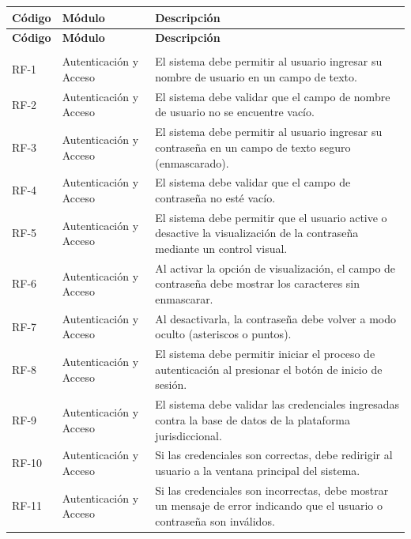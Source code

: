 \documentclass[12pt,a4paper,oneside]{book}
\begin{document}
\begingroup
\small
\setlength{\LTpre}{0pt}
\setlength{\LTpost}{0pt}
\begin{longtable}{@{}>{\centering\arraybackslash}p{2cm}
                    >{\centering\arraybackslash}p{3cm}
                    >{\raggedright\arraybackslash}p{10cm}@{}}
\toprule
\textbf{Código} & \textbf{Módulo} & \textbf{Descripción} \\
\midrule
\endfirsthead
\toprule
\textbf{Código} & \textbf{Módulo} & \textbf{Descripción} \\
\midrule
\endhead
\midrule
\multicolumn{3}{r}{\textit{Continúa en la siguiente página}} \\
\endfoot
\bottomrule
\endlastfoot
RF-1 & Autenticación y Acceso & El sistema debe permitir al usuario ingresar su nombre de usuario en un campo de texto. \\
RF-2 & Autenticación y Acceso & El sistema debe validar que el campo de nombre de usuario no se encuentre vacío. \\
RF-3 & Autenticación y Acceso & El sistema debe permitir al usuario ingresar su contraseña en un campo de texto seguro (enmascarado). \\
RF-4 & Autenticación y Acceso & El sistema debe validar que el campo de contraseña no esté vacío. \\
RF-5 & Autenticación y Acceso & El sistema debe permitir que el usuario active o desactive la visualización de la contraseña mediante un control visual. \\
RF-6 & Autenticación y Acceso & Al activar la opción de visualización, el campo de contraseña debe mostrar los caracteres sin enmascarar. \\
RF-7 & Autenticación y Acceso & Al desactivarla, la contraseña debe volver a modo oculto (asteriscos o puntos). \\
RF-8 & Autenticación y Acceso & El sistema debe permitir iniciar el proceso de autenticación al presionar el botón de inicio de sesión. \\
RF-9 & Autenticación y Acceso & El sistema debe validar las credenciales ingresadas contra la base de datos de la plataforma jurisdiccional. \\
RF-10 & Autenticación y Acceso & Si las credenciales son correctas, debe redirigir al usuario a la ventana principal del sistema. \\
RF-11 & Autenticación y Acceso & Si las credenciales son incorrectas, debe mostrar un mensaje de error indicando que el usuario o contraseña son inválidos. \\
\midrule

\end{longtable}
\end{document}
